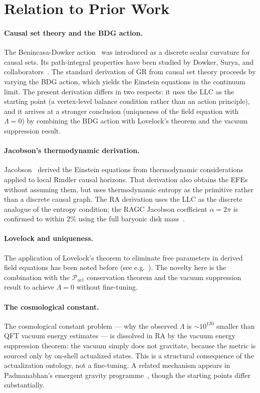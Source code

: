 \documentclass[11pt,a4paper]{article}
\newcommand{\Pact}{\mathcal{P}_{\mathrm{act}}}
\begin{document}
\section{Relation to Prior Work}
\label{sec:related}

\paragraph{Causal set theory and the BDG action.}
The Benincasa-Dowker action~\citep{Benincasa2010} was introduced as a
discrete scalar curvature for causal sets. Its path-integral
properties have been studied by Dowker, Surya, and
collaborators~\citep{Dowker2013}. The standard derivation of GR from
causal set theory proceeds by varying the BDG action, which yields
the Einstein equations in the continuum limit. The present derivation
differs in two respects: it uses the LLC as the starting point (a
vertex-level balance condition rather than an action principle), and
it arrives at a stronger conclusion (uniqueness of the field equation
with $\Lambda = 0$) by combining the BDG action with Lovelock's theorem
and the vacuum suppression result.

\paragraph{Jacobson's thermodynamic derivation.}
Jacobson~\citep{Jacobson1995} derived the Einstein equations from
thermodynamic considerations applied to local Rindler causal horizons.
That derivation also obtains the EFEs without assuming them, but
uses thermodynamic entropy as the primitive rather than a discrete
causal graph. The RA derivation uses the LLC as the discrete analogue
of the entropy condition; the RAGC Jacobson coefficient
$\alpha = 2\pi$ is confirmed to within 2\% using the full baryonic
disk mass~\citep{Sandeman2026RAGC,BlandHawthorn2016}.

\paragraph{Lovelock and uniqueness.}
The application of Lovelock's theorem to eliminate free parameters in
derived field equations has been noted before (see e.g.~\citep{Padmanabhan2015}).
The novelty here is the combination with the $\Pact$ conservation
theorem and the vacuum suppression result to achieve $\Lambda = 0$
without fine-tuning.

\paragraph{The cosmological constant.}
The cosmological constant problem --- why the observed $\Lambda$ is
$\sim10^{120}$ smaller than QFT vacuum energy estimates --- is
dissolved in RA by the vacuum energy suppression theorem: the vacuum
simply does not gravitate, because the metric is sourced only by
on-shell actualized states. This is a structural consequence of the
actualization ontology, not a fine-tuning. A related mechanism appears
in Padmanabhan's emergent gravity programme~\citep{Padmanabhan2015},
though the starting points differ substantially.
\end{document}
